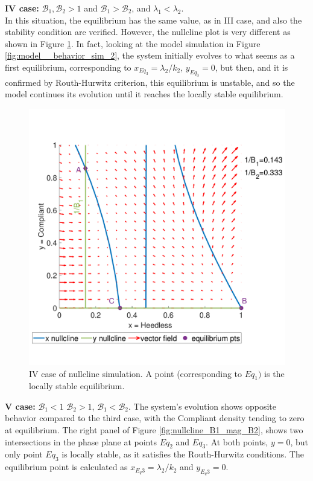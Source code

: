 \noindent\textbf{IV case: } $\mathcal{B}_1, \mathcal{B}_2 >1$ and $\mathcal{B}_1 >  \mathcal{B}_2$, and $\lambda_1 < \lambda_2$. \\
\label{par:behav_4_case}
In this situation, the equilibrium has the same value, as in III case, and also the stability condition are verified. However, the nullcline plot is very different as shown in Figure \ref{fig:prnullclineb1_mag_b2_lambda}. 
In fact, looking at the model simulation in Figure \ref{fig:model__behavior_sim_2}, the system initially evolves to what seems as a first equilibrium, corresponding to $x_{Eq_3} = \lambda_2/k_2$, $y_{Eq_3} = 0$, but then, and it is confirmed by Routh-Hurwitz criterion, this equilibrium is unstable, and so the model continues its evolution until it reaches the locally stable equilibrium. 
\begin{figure}[h]
	\centering
	\includegraphics[width=0.48\linewidth]{1_corpo/figure/behavioural_equilibrium/Pr_nullcline_B1_mag_B2_lambda2_mag}
	\caption[Nullcline fourth case]{IV case of nullcline simulation. A point (corresponding to $Eq_1)$ is the locally stable equilibrium.}
	\label{fig:prnullclineb1_mag_b2_lambda}
\end{figure}
\noindent\textbf{V case: }$\mathcal{B}_1 < 1$ $\mathcal{B}_2 >1$, $\mathcal{B}_1 <  \mathcal{B}_2$.
The system's evolution shows opposite behavior compared to the third case, with the Compliant density tending to zero at equilibrium. The right panel of Figure \ref{fig:nullcline_B1_mag_B2}, shows two intersections in the phase plane at points $Eq_2$ and $Eq_3$. At both points, $y=0$, but only point $Eq_3$ is locally stable, as it satisfies the Routh-Hurwitz conditions. The equilibrium point is calculated as $x_{E_q3}= \lambda_2/k_2$ and $y_{E_q3} = 0$. 


